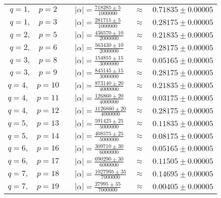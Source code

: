 \documentclass{article}
\begin{document}
	\begin{center}
		\setlength{\tabcolsep}{2pt}\begin{tabular}{clcl}
			$q = 1, \quad p = 2 \quad 	 $ & $ 
			|\alpha| = \frac{718285 \pm 5}{1000000}$ & $ \approx $ & $ 0.71835 \pm 0.00005 $\\
			$q = 1, \quad p = 3 \quad 	 $ & $ 
			|\alpha| = \frac{281715 \pm 5}{1000000}$ & $ \approx $ & $ 0.28175 \pm 0.00005 $\\
			$q = 2, \quad p = 5 \quad 	 $ & $ 
			|\alpha| = \frac{436570 \pm 10}{2000000}$ & $ \approx $ & $ 0.21835 \pm 0.00005 $\\
			$q = 2, \quad p = 6 \quad 	 $ & $ 
			|\alpha| = \frac{563430 \pm 10}{2000000}$ & $ \approx $ & $ 0.28175 \pm 0.00005 $\\
			$q = 3, \quad p = 8 \quad 	 $ & $ 
			|\alpha| = \frac{154855 \pm 15}{3000000}$ & $ \approx $ & $ 0.05165 \pm 0.00005 $\\
			$q = 3, \quad p = 9 \quad 	 $ & $ 
			|\alpha| = \frac{845145 \pm 15}{3000000}$ & $ \approx $ & $ 0.28175 \pm 0.00005 $\\
			$q = 4, \quad p = 10 \quad 	 $ & $ 
			|\alpha| = \frac{873140 \pm 20}{4000000}$ & $ \approx $ & $ 0.21835 \pm 0.00005 $\\
			$q = 4, \quad p = 11 \quad 	 $ & $ 
			|\alpha| = \frac{126860 \pm 20}{4000000}$ & $ \approx $ & $ 0.03175 \pm 0.00005 $\\
			$q = 4, \quad p = 12 \quad 	 $ & $ 
			|\alpha| = \frac{1126860 \pm 20}{4000000}$ & $ \approx $ & $ 0.28175 \pm 0.00005 $\\
			$q = 5, \quad p = 13 \quad 	 $ & $ 
			|\alpha| = \frac{591425 \pm 25}{5000000}$ & $ \approx $ & $ 0.11835 \pm 0.00005 $\\
			$q = 5, \quad p = 14 \quad 	 $ & $ 
			|\alpha| = \frac{408575 \pm 25}{5000000}$ & $ \approx $ & $ 0.08175 \pm 0.00005 $\\
			$q = 6, \quad p = 16 \quad 	 $ & $ 
			|\alpha| = \frac{309710 \pm 30}{6000000}$ & $ \approx $ & $ 0.05165 \pm 0.00005 $\\
			$q = 6, \quad p = 17 \quad 	 $ & $ 
			|\alpha| = \frac{690290 \pm 30}{6000000}$ & $ \approx $ & $ 0.11505 \pm 0.00005 $\\
			$q = 7, \quad p = 18 \quad 	 $ & $ 
			|\alpha| = \frac{1027995 \pm 35}{7000000}$ & $ \approx $ & $ 0.14695 \pm 0.00005 $\\
			$q = 7, \quad p = 19 \quad 	 $ & $ 
			|\alpha| = \frac{27995 \pm 35}{7000000}$ & $ \approx $ & $ 0.00405 \pm 0.00005 $\\

\end{tabular}
\end{center}
\end{document}
